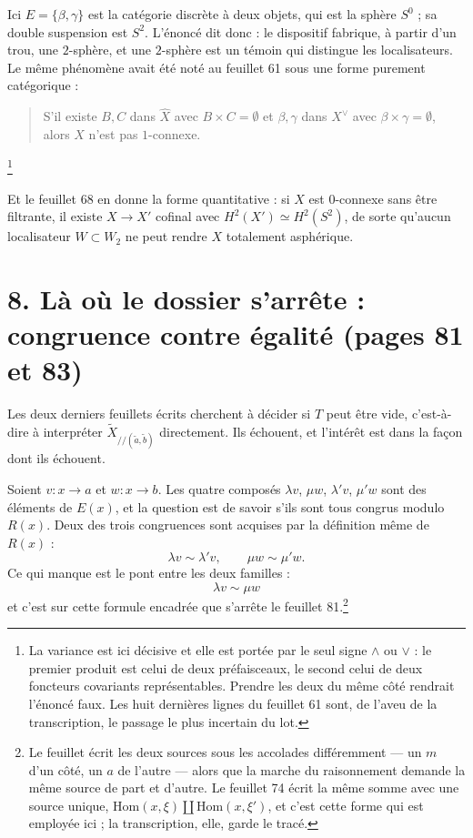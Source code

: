 \documentclass[11pt,a4paper]{article}
\begin{document}
Ici $E = \{\beta,\gamma\}$ est la catégorie discrète à deux objets, qui est la
sphère $S^{0}$ ; sa double suspension est $S^{2}$. L'énoncé dit donc : le
dispositif fabrique, à partir d'un trou, une $2$-sphère, et une $2$-sphère est
un témoin qui distingue les localisateurs. Le même phénomène avait été noté
au feuillet 61 sous une forme purement catégorique :

\begin{quote}
S'il existe $B, C$ dans $\widehat{X}$ avec $B \times C = \emptyset$ et
$\beta, \gamma$ dans $X^{\vee}$ avec $\beta \times \gamma = \emptyset$, alors
$X$ n'est pas $1$-connexe.
\end{quote}

\footnote{La variance est ici décisive et elle est portée par le seul signe
$\wedge$ ou $\vee$ : le premier produit est celui de deux préfaisceaux, le
second celui de deux foncteurs covariants représentables. Prendre les deux du
même côté rendrait l'énoncé faux. Les huit dernières lignes du feuillet 61
sont, de l'aveu de la transcription, le passage le plus incertain du lot.}

Et le feuillet 68 en donne la forme quantitative : si $X$ est $0$-connexe sans
être filtrante, il existe $X \to X'$ cofinal avec
$H^{2}(X') \simeq H^{2}(S^{2})$, de sorte qu'aucun localisateur $W \subset W_{2}$
ne peut rendre $X$ totalement asphérique.

\section*{8. Là où le dossier s'arrête : congruence contre égalité (pages 81 et 83)}

Les deux derniers feuillets écrits cherchent à décider si $T$ peut être vide,
c'est-à-dire à interpréter $\tilde X_{/\!/(\tilde a,\tilde b)}$ directement.
Ils échouent, et l'intérêt est dans la façon dont ils échouent.

Soient $v : x \to a$ et $w : x \to b$. Les quatre composés
$\lambda v$, $\mu w$, $\lambda' v$, $\mu' w$ sont des éléments de $E(x)$, et la
question est de savoir s'ils sont tous congrus modulo $R(x)$. Deux des trois
congruences sont acquises par la définition même de $R(x)$ :
\[
  \lambda v \sim \lambda' v, \qquad \mu w \sim \mu' w .
\]
Ce qui manque est le pont entre les deux familles :
\[
  \boxed{\ \lambda v \sim \mu w\ }
\]
et c'est sur cette formule encadrée que s'arrête le feuillet 81.\footnote{Le
feuillet écrit les deux sources sous les accolades différemment — un $m$ d'un
côté, un $a$ de l'autre — alors que la marche du raisonnement demande la même
source de part et d'autre. Le feuillet 74 écrit la même somme avec une source
unique, $\mathrm{Hom}(x,\xi) \amalg \mathrm{Hom}(x,\xi')$, et c'est cette
forme qui est employée ici ; la transcription, elle, garde le tracé.}
\end{document}
